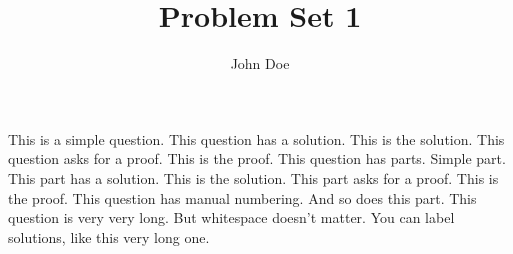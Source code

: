\documentclass{article}
\title{Problem Set 1}
\author{John Doe}
\begin{document}
\maketitle

\begin{questions}
  \qn This is a simple question.
  \qn This question has a solution.
  \sn This is the solution.
  \qn This question asks for a proof.
  \pf This is the proof.
  \qn This question has parts.
    \pt Simple part.
    \pt This part has a solution.
    \sn This is the solution.
    \pt This part asks for a proof.
    \pf This is the proof.
  \qn[11.5] This question has manual numbering.
  \pt[(ii)] And so does this part.
  \qn This question is
      very very long.
      But whitespace doesn't matter.
  \sn \label{special}
      You can label solutions,
      like this very long one.
\end{questions}
\end{document}
